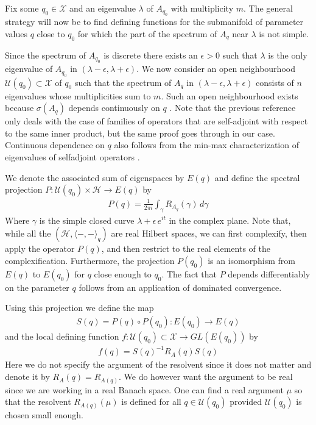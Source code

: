 Fix some $q_0\in\mathcal{X}$ and an eigenvalue $\lambda$ of $A_{q_0}$ with multiplicity $m$. The general strategy will now be to find defining functions for the submanifold of parameter values $q$ close to $q_0$ for which the part of the spectrum of $A_q$ near $\lambda$ is not simple.\par
Since the spectrum of $A_{q_0}$ is discrete there exists an $\epsilon >0$ such that $\lambda$ is the only eigenvalue of $A_{q_0}$ in $(\lambda-\epsilon,\lambda+\epsilon)$. We now consider an open neighbourhood $\mathcal{U}(q_0)\subset \mathcal{X}$ of $q_0$ such that the spectrum of $A_q$ in $(\lambda-\epsilon,\lambda+\epsilon)$ consists of $n$ eigenvalues whose multiplicities sum to $m$. Such an open neighbourhood exists because $\sigma(A_q)$ depends continuously on $q$ \cite[pp. 372-373]{RieszNagy1955}. Note that the previous reference only deals with the case of families of operators that are self-adjoint with respect to the same inner product, but the same proof goes through in our case. Continuous dependence on $q$ also follows from the min-max characterization of eigenvalues of selfadjoint operators \cite[Theorem 4.10]{GeraldTeschl2014}.\par
We denote the associated sum of eigenspaces by $E(q)$ and define the spectral projection $P:\mathcal{U}(q_0)\times \mathcal{H}\to E(q)$ by
\begin{align*}
    P(q)=\frac{1}{2\pi i}\int_\gamma R_{A_q}(\gamma)\,d\gamma
\end{align*}
Where $\gamma$ is the simple closed curve $\lambda+\epsilon\,e^{it}$ in the complex plane. Note that, while all the $(\mathcal{H},\langle-,-\rangle_{q})$ are real Hilbert spaces, we can first complexify, then apply the operator $P(q)$, and then restrict to the real elements of the complexification. Furthermore, the projection $P(q_0)$ is an isomorphism from $E(q)$ to $E(q_0)$ for $q$ close enough to $q_0$. The fact that $P$ depends differentiably on the parameter $q$ follows from an application of dominated convergence.\par
Using this projection we define the map 
\begin{align*}
    S(q)=P(q)\circ P(q_0):E(q_0)\to E(q) 
\end{align*}
and the local defining function $f:\mathcal{U}(q_0)\subset\mathcal{X}\to GL(E(q_0))$ by
\begin{align*}
    f(q)=S(q)^{-1}R_{A}(q)S(q)
\end{align*}
Here we do not specify the argument of the resolvent since it does not matter and denote it by $R_{A}(q)=R_{A(q)}$. We do however want the argument to be real since we are working in a real Banach space. One can find a real argument $\mu$ so that the resolvent $R_{A(q)}(\mu)$ is defined for all $q\in \mathcal{U}(q_0)$ provided $\mathcal{U}(q_0)$ is chosen small enough.\par
